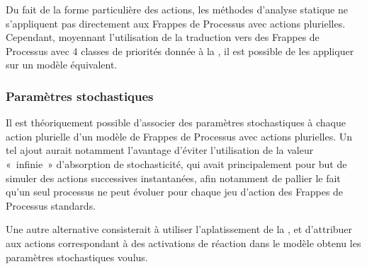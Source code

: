Du fait de la forme particulière des actions, les méthodes d'analyse statique ne s'appliquent pas
directement aux Frappes de Processus avec actions plurielles.
Cependant, moyennant l'utilisation de la traduction vers des Frappes de Processus
avec 4 classes de priorités donnée à la ,
il est possible de les appliquer sur un modèle équivalent.

\subsubsection{Paramètres stochastiques}

Il est théoriquement possible d'associer des paramètres stochastiques à chaque action plurielle
d'un modèle de Frappes de Processus avec actions plurielles.
Un tel ajout aurait notamment l'avantage d'éviter l'utilisation de la valeur «~infinie~»
d'absorption de stochasticité, qui avait principalement pour but de simuler des actions
successives instantanées, afin notamment de pallier le fait qu'un seul processus
ne peut évoluer pour chaque jeu d'action des Frappes de Processus standards.

Une autre alternative consisterait à utiliser l'aplatissement de la ,
et d'attribuer aux actions correspondant à des activations de réaction
dans le modèle obtenu les paramètres stochastiques voulus.
